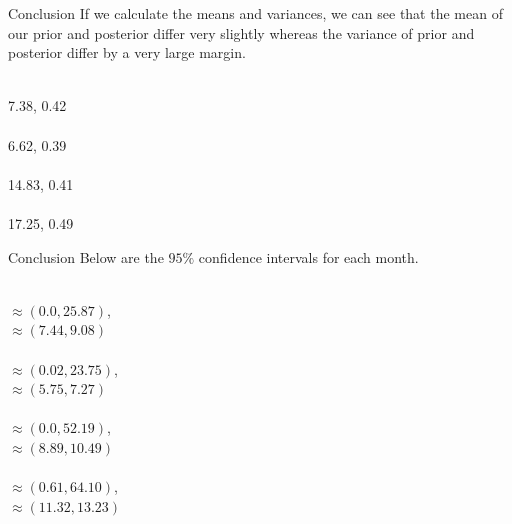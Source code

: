 \documentclass{beamer}
\begin{document}
\begin{frame}{Conclusion}
If we calculate the means and variances, we can see that the mean of our prior and posterior differ very slightly whereas the variance of prior and posterior differ by a very large margin.

        \begin{center}
             \\
             7.38,  0.42 \\
             \\
             6.62, 0.39 \\
             \\
             14.83, 0.41 \\
             \\
             17.25, 0.49 \\
        \end{center}
\end{frame}

\begin{frame}{Conclusion}
Below are the $95\%$ confidence intervals for each month.
        \begin{center}
             \\
             $\approx \left( 0.0, 25.87 \right)$,\\  $\approx \left( 7.44, 9.08  \right)$ \\
             \\
            $\approx \left( 0.02, 23.75 \right)$,\\  $\approx \left(5.75, 7.27 \right)$ \\
             \\
             $\approx \left( 0.0, 52.19 \right)$,\\ $\approx \left( 8.89, 10.49 \right)$ \\
             \\
            $\approx \left( 0.61, 64.10 \right)$,\\ $\approx \left( 11.32, 13.23 \right)$ \\
        \end{center}
\end{frame}
\end{document}

